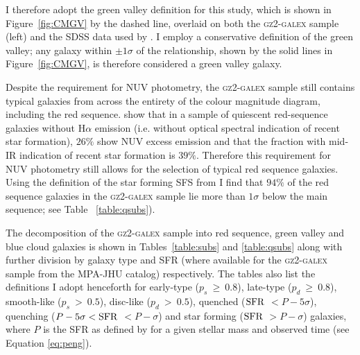 I therefore adopt the \citet{Baldry04} green valley definition for this study, which is shown in Figure~\ref{fig:CMGV} by the dashed line, overlaid on both the \textsc{gz2-galex} sample (left) and the SDSS data used by \citet[][right]{Baldry04}. I employ a conservative definition of the green valley; any galaxy within $\pm 1\sigma$ of the \citeauthor{Baldry04} relationship, shown by the solid lines in Figure~\ref{fig:CMGV}, is therefore considered a green valley galaxy. 

Despite the requirement for NUV photometry, the \textsc{gz2-galex} sample still contains typical galaxies from across the entirety of the colour magnitude diagram, including the red sequence. \cite{ko13} show that in a sample of quiescent red-sequence galaxies without $\mathrm{H}\alpha$ emission (i.e. without optical spectral indication of recent star formation), $26\%$ show NUV excess emission and that the fraction with mid-IR indication of recent star formation is $39\%$. Therefore this requirement for NUV photometry still allows for the selection of typical red sequence galaxies. Using the definition of the star forming SFS from \citet[][see Section~\ref{qmod}]{peng10} I find that $94\%$ of the red sequence galaxies in the \textsc{gz2-galex} sample lie more than $1\sigma$ below the main sequence; see Table ~\ref{table:qsubs}). 

The decomposition of the \textsc{gz2-galex} sample into red sequence, green valley and blue cloud galaxies is shown in Tables~\ref{table:subs} and \ref{table:qsubs} along with further division by galaxy type and SFR (where available for the \textsc{gz2-galex} sample from the MPA-JHU catalog) respectively. The tables also list the definitions I adopt henceforth for early-type ($p_s~ \geq~0.8$), late-type ($p_d~ \geq~0.8$), smooth-like ($p_s~ >~0.5$), disc-like ($p_d~ >~0.5$), quenched ($\rm{SFR}$ $ < P - 5\sigma$), quenching ($P - 5\sigma < \rm{SFR}$ $< P - \sigma$) and star forming  ($\rm{SFR}$ $> P -\sigma$) galaxies, where $P$ is the SFR as defined by \citet{peng10} for a given stellar mass and observed time (see Equation \ref{eq:peng}). 

